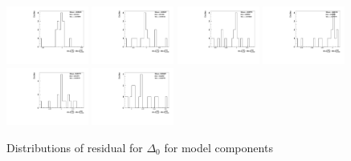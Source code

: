 \begin{figure}[h]
    \includegraphics[width=0.24\textwidth]{figure/polarimetery/syst/model/output_model_4740_delta0.pdf}
    \includegraphics[width=0.24\textwidth]{figure/polarimetery/syst/model/output_model_4750_delta0.pdf}
    \includegraphics[width=0.24\textwidth]{figure/polarimetery/syst/model/output_model_4780_delta0.pdf}
    \includegraphics[width=0.24\textwidth]{figure/polarimetery/syst/model/output_model_4840_delta0.pdf}
    \includegraphics[width=0.24\textwidth]{figure/polarimetery/syst/model/output_model_4920_delta0.pdf}
    \includegraphics[width=0.24\textwidth]{figure/polarimetery/syst/model/output_model_4950_delta0.pdf}
    \caption{Distributions of residual for $\Delta_0$ for model components}
\label{fig:angular_model_delta0}
\end{figure}

